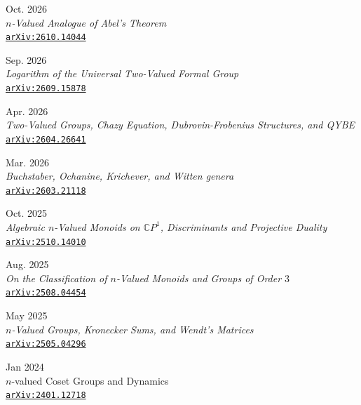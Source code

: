 \documentclass[11pt,letterpaper]{report}
\begin{document}
           \begin{tablist}
          \item[Oct. 2026]\\ {\it $n$-Valued Analogue of Abel's Theorem}\\ \href{https://doi.org/10.48550/arXiv.2610.14044}{\tt arXiv:2610.14044}
          \item[Sep. 2026]\\ {\it Logarithm of the Universal Two-Valued Formal Group}\\ \href{https://doi.org/10.48550/arXiv.2609.15878}{\tt arXiv:2609.15878}
          \item[Apr. 2026]\\ {\it Two-Valued Groups, Chazy Equation, Dubrovin-Frobenius Structures, and QYBE}\\ \href{https://doi.org/10.48550/arXiv.2604.26641}{\tt arXiv:2604.26641}
          \item[Mar. 2026]\\ {\it Buchstaber, Ochanine, Krichever, and Witten genera}\\ \href{https://doi.org/10.48550/arXiv.2603.21118}{\tt arXiv:2603.21118}
          \item[Oct. 2025] \\ {\it Algebraic $n$-Valued Monoids on $\mathbb{C}P^1$, Discriminants and Projective Duality}\\ \href{https://doi.org/10.48550/arXiv.2510.14010}{\tt arXiv:2510.14010}
	 \item[Aug. 2025] \\ {\it On the Classification of $n$-Valued Monoids and Groups of Order $3$}\\ 	\href{https://doi.org/10.48550/arXiv.2508.04454}{\tt arXiv:2508.04454}
	 \item[May 2025] \\ {{\it $n$-Valued Groups, Kronecker Sums, and Wendt's Matrices}}\\ \href{https://doi.org/10.48550/arXiv.2505.04296}{\tt arXiv:2505.04296}
         \item[Jan 2024]\\ {$n$-valued Coset Groups and Dynamics}\\  \href{https://doi.org/10.48550/arXiv.2401.12718}{\tt arXiv:2401.12718}
    
           \end{tablist}
    
\end{document}
